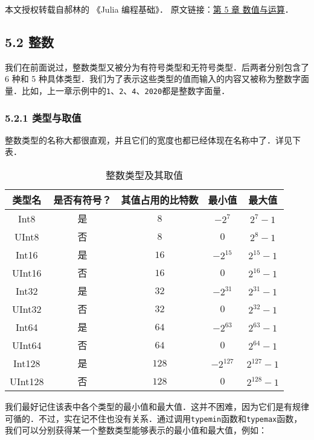
本文授权转载自郝林的 《Julia 编程基础》． 原文链接：\href{https://github.com/hyper0x/JuliaBasics/blob/master/book/ch05.md}{第 5 章 数值与运算}．


\subsection{5.2 整数}

我们在前面说过，整数类型又被分为有符号类型和无符号类型．后两者分别包含了 6 种和 5 种具体类型．我们为了表示这些类型的值而输入的内容又被称为整数字面量．比如，上一章示例中的\verb|1|、\verb|2|、\verb|4|、\verb|2020|都是整数字面量．

\subsubsection{5.2.1 类型与取值}

整数类型的名称大都很直观，并且它们的宽度也都已经体现在名称中了．详见下表．

\begin{table}[ht]
\centering
\caption{整数类型及其取值}\label{JuC5S2_tab1}
\begin{tabular}{|c|c|c|c|c|}
\hline
类型名 & 是否有符号？& 其值占用的比特数 & 最小值 & 最大值 \\
\hline
Int8 & 是 & $8$ & $-2^7$ & $2^7 - 1$ \\
\hline
UInt8 & 否 & $8$ & $0$ & $2^8 - 1$ \\
\hline
Int16 & 是 & $16$ & $-2^{15}$ & $2^{15} - 1$ \\
\hline
UInt16 & 否 & $16$ & $0$ & $2^{16} - 1$ \\
\hline
Int32 & 是 & $32$ & $-2^{31}$ & $2^{31} - 1$ \\
\hline
UInt32 & 否 & $32$ & $0$ & $2^{32} - 1$ \\
\hline
Int64 & 是 & $64$ & $-2^{63}$ & $2^{63} - 1$ \\
\hline
UInt64 & 否 & $64$ & $0$ & $2^{64} - 1$ \\
\hline
Int128 & 是 & $128$ & $-2^{127}$ & $2^{127} - 1$ \\
\hline
UInt128 & 否 & $128$ & $0$ & $2^{128} - 1$ \\
\hline
\end{tabular}
\end{table}


我们最好记住该表中各个类型的最小值和最大值．这并不困难，因为它们是有规律可循的．不过，实在记不住也没有关系．通过调用\verb|typemin|函数和\verb|typemax|函数，我们可以分别获得某一个整数类型能够表示的最小值和最大值，例如：

